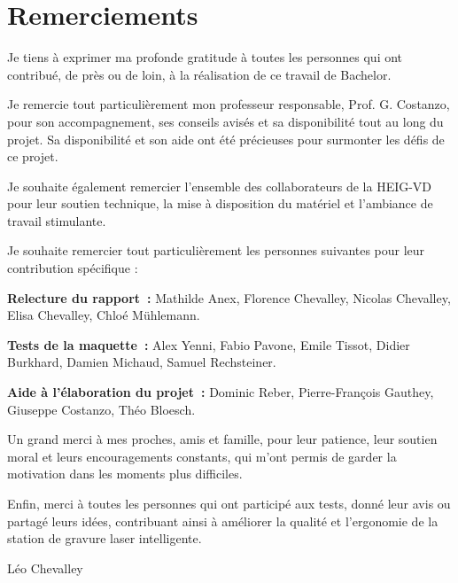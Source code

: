 \chapter*{Remerciements}

Je tiens à exprimer ma profonde gratitude à toutes les personnes qui ont contribué, de près ou de loin, à la réalisation de ce travail de Bachelor.

Je remercie tout particulièrement mon professeur responsable, Prof. G. Costanzo, pour son accompagnement, ses conseils avisés et sa disponibilité tout au long du projet. Sa disponibilité et son aide ont été précieuses pour surmonter les défis de ce projet.

Je souhaite également remercier l’ensemble des collaborateurs de la HEIG-VD pour leur soutien technique, la mise à disposition du matériel et l’ambiance de travail stimulante.

Je souhaite remercier tout particulièrement les personnes suivantes pour leur contribution spécifique :

\textbf{Relecture du rapport~:} Mathilde Anex, Florence Chevalley, Nicolas Chevalley, Elisa Chevalley, Chloé Mühlemann.

\textbf{Tests de la maquette~:} Alex Yenni, Fabio Pavone, Emile Tissot, Didier Burkhard, Damien Michaud, Samuel Rechsteiner.

\textbf{Aide à l'élaboration du projet~:} Dominic Reber, Pierre-François Gauthey, Giuseppe Costanzo, Théo Bloesch.

Un grand merci à mes proches, amis et famille, pour leur patience, leur soutien moral et leurs encouragements constants, qui m’ont permis de garder la motivation dans les moments plus difficiles.

Enfin, merci à toutes les personnes qui ont participé aux tests, donné leur avis ou partagé leurs idées, contribuant ainsi à améliorer la qualité et l’ergonomie de la station de gravure laser intelligente.

\vspace{1cm}
\begin{flushright}
    Léo Chevalley
\end{flushright}
